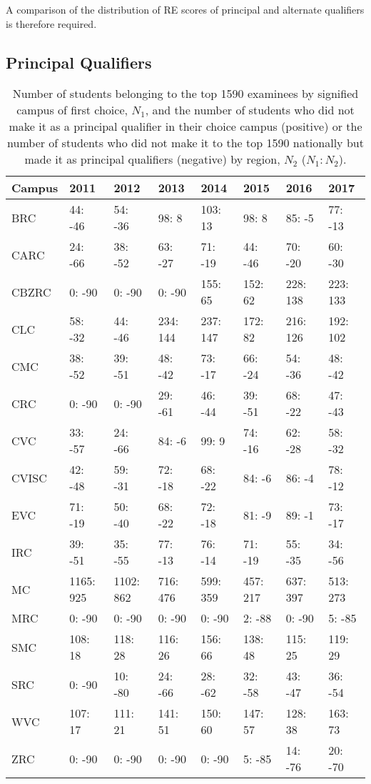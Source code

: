 \documentclass[]{article}
\begin{document}
A comparison of the distribution of RE scores of principal and alternate
qualifiers is therefore required.

\hypertarget{principal-qualifiers}{%
\subsection{Principal Qualifiers}\label{principal-qualifiers}}

\begin{table}

\caption{\label{tab:unnamed-chunk-5}Number of students belonging to the top 1590 examinees by signified campus of first choice, $N_1$, and the number of students who did not make it as a principal qualifier in their choice campus (positive) or the number of students who did not make it to the top 1590 nationally but made it as principal qualifiers (negative) by region, $N_2$ ($N_1: N_2$).}
\centering
\begin{tabular}[t]{llllllll}
\toprule
Campus & 2011 & 2012 & 2013 & 2014 & 2015 & 2016 & 2017\\
\midrule
BRC & 44: -46 & 54: -36 & 98: 8 & 103: 13 & 98: 8 & 85: -5 & 77: -13\\
CARC & 24: -66 & 38: -52 & 63: -27 & 71: -19 & 44: -46 & 70: -20 & 60: -30\\
CBZRC & 0: -90 & 0: -90 & 0: -90 & 155: 65 & 152: 62 & 228: 138 & 223: 133\\
CLC & 58: -32 & 44: -46 & 234: 144 & 237: 147 & 172: 82 & 216: 126 & 192: 102\\
CMC & 38: -52 & 39: -51 & 48: -42 & 73: -17 & 66: -24 & 54: -36 & 48: -42\\
\addlinespace
CRC & 0: -90 & 0: -90 & 29: -61 & 46: -44 & 39: -51 & 68: -22 & 47: -43\\
CVC & 33: -57 & 24: -66 & 84: -6 & 99: 9 & 74: -16 & 62: -28 & 58: -32\\
CVISC & 42: -48 & 59: -31 & 72: -18 & 68: -22 & 84: -6 & 86: -4 & 78: -12\\
EVC & 71: -19 & 50: -40 & 68: -22 & 72: -18 & 81: -9 & 89: -1 & 73: -17\\
IRC & 39: -51 & 35: -55 & 77: -13 & 76: -14 & 71: -19 & 55: -35 & 34: -56\\
\addlinespace
MC & 1165: 925 & 1102: 862 & 716: 476 & 599: 359 & 457: 217 & 637: 397 & 513: 273\\
MRC & 0: -90 & 0: -90 & 0: -90 & 0: -90 & 2: -88 & 0: -90 & 5: -85\\
SMC & 108: 18 & 118: 28 & 116: 26 & 156: 66 & 138: 48 & 115: 25 & 119: 29\\
SRC & 0: -90 & 10: -80 & 24: -66 & 28: -62 & 32: -58 & 43: -47 & 36: -54\\
WVC & 107: 17 & 111: 21 & 141: 51 & 150: 60 & 147: 57 & 128: 38 & 163: 73\\
ZRC & 0: -90 & 0: -90 & 0: -90 & 0: -90 & 5: -85 & 14: -76 & 20: -70\\
\bottomrule
\end{tabular}
\end{table}
\end{document}
